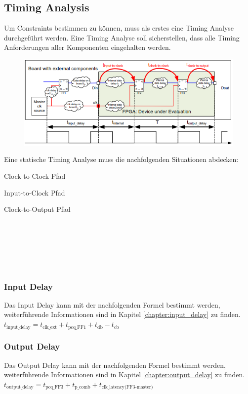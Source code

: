 \subsection{Timing Analysis}
Um Constraints bestimmen zu können, muss als erstes eine Timing Analyse durchgeführt werden. Eine Timing Analyse soll sicherstellen, dass alle Timing Anforderungen aller Komponenten eingehalten werden. \\
\begin{minipage}{0.65\textwidth}
    \begin{figure}[H]
        \includegraphics[width=\textwidth]{images/static_timing_analysis.png}
    \end{figure}
\end{minipage}
\hfill
\begin{minipage}{0.3\textwidth}
    Eine statische Timing Analyse muss die nachfolgenden Situationen abdecken:
    \begin{compactitem}
        \item Clock-to-Clock Pfad
        \item Input-to-Clock Pfad
        \item Clock-to-Output Pfad
    \end{compactitem}
    \ \\ \ \\ \ \\ \ \\ \ \\
\end{minipage}
\hspace*{+1cm}
\begin{multicols}{2}
    \subsubsection{Input Delay}
    Das Input Delay kann mit der nachfolgenden Formel bestimmt werden, weiterführende Informationen sind in Kapitel \ref{chapter:input_delay} zu finden. \\
    $t_{\text{input\_delay}}=t_{\text{clk\_ext}}+t_{\text{pcq\_FF1}}+t_{\text{db}}-t_{\text{cb}}$
    
    \subsubsection{Output Delay}
    Das Output Delay kann mit der nachfolgenden Formel bestimmt werden, weiterführende Informationen sind in Kapitel \ref{chapter:output_delay} zu finden. \\
    $t_{\text{output\_delay}}=t_{\text{pcq\_FF3}}+t_{\text{p\_comb}}+t_{\text{clk\_latency(FF3-master)}}$
\end{multicols} 

